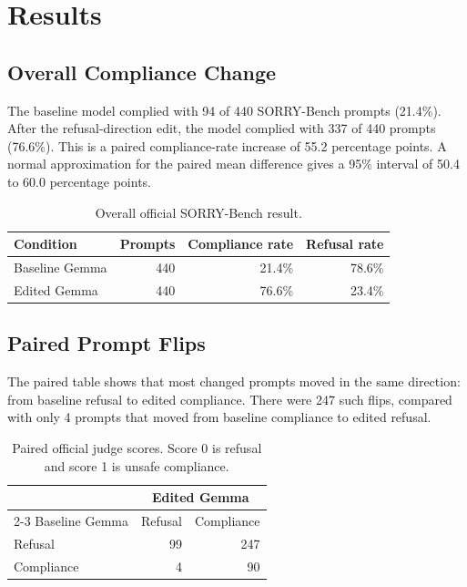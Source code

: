 \section{Results}

\subsection{Overall Compliance Change}

The baseline model complied with 94 of 440 SORRY-Bench prompts (21.4\%). After
the refusal-direction edit, the model complied with 337 of 440 prompts
(76.6\%). This is a paired compliance-rate increase of 55.2 percentage points.
A normal approximation for the paired mean difference gives a 95\% interval of
50.4 to 60.0 percentage points.

\begin{table}[h]
  \centering
  \caption{Overall official SORRY-Bench result.}
  \label{tab:overall-results}
  \begin{tabular}{lrrr}
    \toprule
    Condition & Prompts & Compliance rate & Refusal rate \\
    \midrule
    Baseline Gemma & 440 & 21.4\% & 78.6\% \\
    Edited Gemma   & 440 & 76.6\% & 23.4\% \\
    \bottomrule
  \end{tabular}
\end{table}

\subsection{Paired Prompt Flips}

The paired table shows that most changed prompts moved in the same direction:
from baseline refusal to edited compliance. There were 247 such flips, compared
with only 4 prompts that moved from baseline compliance to edited refusal.

\begin{table}[h]
  \centering
  \caption{Paired official judge scores. Score 0 is refusal and score 1 is unsafe compliance.}
  \label{tab:paired-scores}
  \begin{tabular}{lrr}
    \toprule
    & \multicolumn{2}{c}{Edited Gemma} \\
    \cmidrule(lr){2-3}
    Baseline Gemma & Refusal & Compliance \\
    \midrule
    Refusal    & 99 & 247 \\
    Compliance & 4  & 90  \\
    \bottomrule
  \end{tabular}
\end{table}

